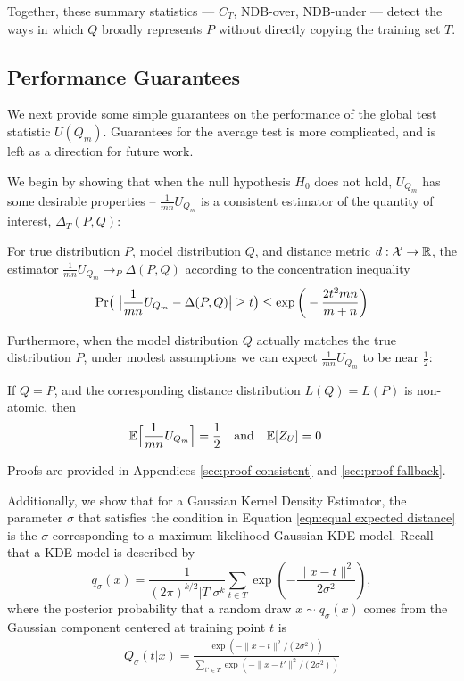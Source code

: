 Together, these summary statistics --- $C_T$, NDB-over, NDB-under --- detect the ways in which $Q$ broadly represents $P$ without directly copying the training set $T$. 

\subsection{Performance Guarantees}
\label{sec:perf guarantees}

We next provide some simple guarantees on the performance of the global test statistic $U(Q_m)$. Guarantees for the average test is more complicated, and is left as a direction for future work.

We begin by showing that when the null hypothesis $H_0$ does not hold, $U_{Q_m}$ has some desirable properties -- $\frac{1}{mn} U_{Q_m}$ is a consistent estimator of the quantity of interest, $\Delta_T(P,Q)$: 
\begin{thm}
    \label{thm:consistent}
    For true distribution $P$, model distribution $Q$, and distance metric $d:\mathcal{X} \rightarrow {\mathbb R}$, the estimator $\frac{1}{mn} U_{Q_m} \rightarrow_P \Delta(P,Q)$ according to the concentration inequality 
    \begin{align*}
        {\mbox{\rm Pr}} \big( \ \big|\frac{1}{mn} U_{Q_m} - \Delta(P,Q) \big| \geq t\big) \leq 
        \exp \bigg( -\frac{2 t^2 mn}{m + n} \bigg)
    \end{align*}
\end{thm}
Furthermore, when the model distribution $Q$ actually matches the true distribution $P$, under modest assumptions we can expect $\frac{1}{mn} U_{Q_m}$ to be near $\frac{1}{2}$: 
\begin{thm}
    \label{thm:fallback}
    If $Q = P$, and the corresponding distance distribution $L(Q) = L(P)$ is non-atomic, then
    \begin{align*}
         {\mathbb E} \Big[ \frac{1}{mn}U_{Q_m} \Big] &= \frac{1}{2}
         \quad \text{and} \quad {\mathbb E} [Z_U] = 0
    \end{align*}
\end{thm} 
Proofs are provided in Appendices \ref{sec:proof consistent} and \ref{sec:proof fallback}. 

Additionally, we show that for a Gaussian Kernel Density Estimator, the parameter $\sigma$ that satisfies the condition in Equation \ref{eqn:equal expected distance} is the $\sigma$ corresponding to a maximum likelihood Gaussian KDE model. Recall that a KDE model is described by
\begin{equation}
q_\sigma(x) = \frac{1}{(2\pi)^{k/2}|T| \sigma^k} \sum_{t \in T} \exp\left( -\frac{\|x-t\|^2}{2 \sigma^2}\right) ,
\label{eqn:kde}
\end{equation}
where the posterior probability that a random draw $x \sim q_\sigma(x)$ comes from the Gaussian component centered at training point $t$ is
\begin{align*}
    Q_\sigma(t|x) = \frac{\exp(-\|x - t\|^2/(2 \sigma^2))}{\sum_{t' \in T}\exp(-\|x - t'\|^2/(2 \sigma^2))}
\end{align*}

